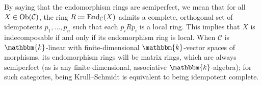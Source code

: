 \noindent By saying that the endomorphism rings are semiperfect, we mean that for all $X \in \textnormal{Ob}(\mathcal{C})$, the ring $R \coloneqq \textup{End}_\mathcal{C}(X)$ admits a complete, orthogonal set of idempotents $p_1, \dots, p_n$ such that each $p_iRp_i$ is a local ring. This implies that $X$ is indecomposable if and only if its endomorphism ring is local. When $\mathcal{C}$ is $\mathbbm{k}$-linear with finite-dimensional $\mathbbm{k}$-vector spaces of morphisms, its endomorphism rings will be matrix rings, which are always semiperfect (as is any finite-dimensional, associative $\mathbbm{k}$-algebra); for such categories, being Krull--Schmidt is equivalent to being idempotent complete.\\



